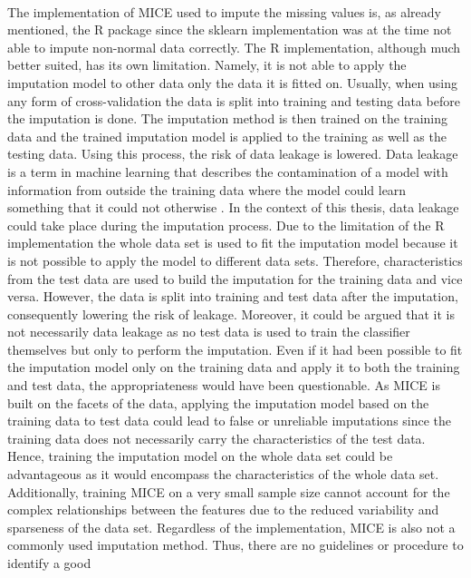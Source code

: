 \\
The implementation of MICE used to impute the missing values is, as already 
mentioned, the R package  since the sklearn implementation was at 
the time not able to impute non-normal data correctly. The R implementation, 
although much better suited, has its own limitation. Namely, it is not able to 
apply the imputation model to other data only the data it is fitted on. 
Usually, when using any form of cross-validation the data is split into 
training and testing data before the imputation is done. The imputation method 
is then trained on the training data and the trained imputation model is 
applied to the training as well as the testing data. Using this process, the 
risk of data leakage is lowered.
Data leakage is a term in machine learning 
that describes the contamination of a model with information from outside the 
training data where the model could learn something that it could not 
otherwise \cite{RN199}.
In the context of this thesis, data leakage could take place during the 
imputation process. Due to the limitation of the R implementation the whole 
data set is used to fit the imputation model because it is not possible to 
apply the model to different data sets. Therefore, characteristics from the 
test data are used to build the imputation for the training data and vice 
versa. However, the data is split into training and test data after the 
imputation, consequently lowering the risk of leakage. Moreover, it could be 
argued that it is not necessarily data leakage as no test data is used to train 
the classifier themselves but only to perform the imputation.
Even if it had been possible to fit the imputation model only on the training 
data and apply it to both the training and test data, the appropriateness would 
have been questionable. As MICE is built on the facets of the data, applying 
the imputation model based on the training data to test data could lead to 
false or unreliable imputations since the training data does not necessarily 
carry the characteristics of the test data. Hence, training the imputation 
model on the whole data set could be advantageous as it would encompass the 
characteristics of the whole data set. Additionally, training MICE on a very 
small sample size cannot account for the complex relationships between the 
features due to the reduced variability and sparseness of the data set.
Regardless of the implementation, MICE is also not a commonly used imputation 
method. Thus, there are no guidelines or procedure to identify a good 
